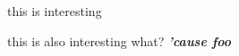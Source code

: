 \newcommand {\RSKYLTOCINC }{}
this is interesting

this is also interesting
\what {} what?{} \what {}
\textbf {\textit {'cause foo}}
